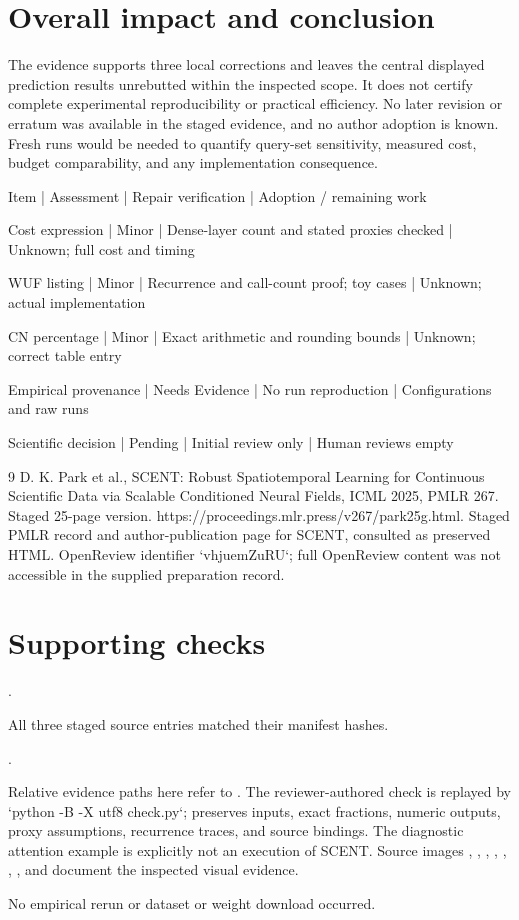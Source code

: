 \documentclass[10pt]{article}
\begin{document}
\section*{Overall impact and conclusion}
The evidence supports three local corrections and leaves the central displayed prediction results unrebutted within the inspected scope. It does not certify complete experimental reproducibility or practical efficiency. No later revision or erratum was available in the staged evidence, and no author adoption is known. Fresh runs would be needed to quantify query-set sensitivity, measured cost, budget comparability, and any implementation consequence.\par
Item | Assessment | Repair verification | Adoption / remaining work\par
Cost expression | Minor | Dense-layer count and stated proxies checked | Unknown; full cost and timing\par
WUF listing | Minor | Recurrence and call-count proof; toy cases | Unknown; actual implementation\par
CN percentage | Minor | Exact arithmetic and rounding bounds | Unknown; correct table entry\par
Empirical provenance | Needs Evidence | No run reproduction | Configurations and raw runs\par
Scientific decision | Pending | Initial review only | Human reviews empty\par
9 D. K. Park et al., SCENT: Robust Spatiotemporal Learning for Continuous Scientific Data via Scalable Conditioned Neural Fields, ICML 2025, PMLR 267. Staged 25-page version. https://proceedings.mlr.press/v267/park25g.html. Staged PMLR record and author-publication page for SCENT, consulted as preserved HTML. OpenReview identifier `vhjuemZuRU`; full OpenReview content was not accessible in the supplied preparation record.\par
\section*{Supporting checks}
.\par
All three staged source entries matched their manifest hashes.\par
.\par
Relative evidence paths here refer to . The reviewer-authored check is replayed by `python -B -X utf8 check.py`; preserves inputs, exact fractions, numeric outputs, proxy assumptions, recurrence traces, and source bindings. The diagnostic attention example is explicitly not an execution of SCENT. Source images , , , , , , , and document the inspected visual evidence.\par
No empirical rerun or dataset or weight download occurred.\par
\end{document}
